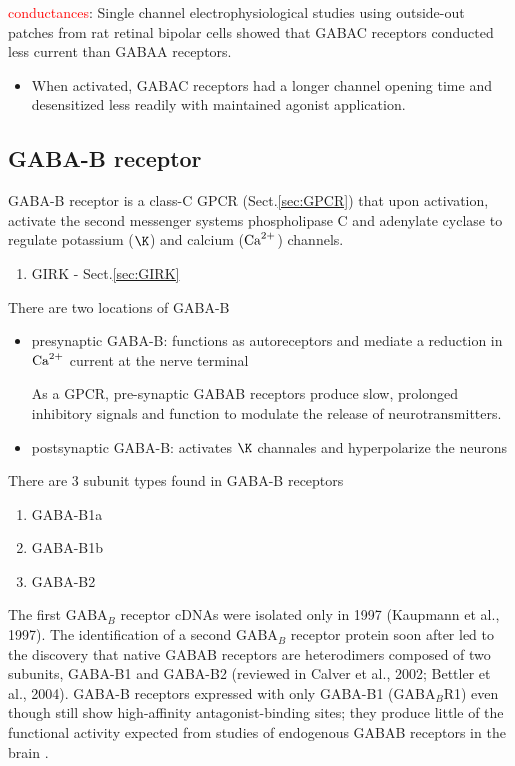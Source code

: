 \textcolor{red}{conductances}: Single channel electrophysiological studies using
outside-out patches from rat retinal bipolar cells showed that GABAC receptors
conducted less current than GABAA receptors. 
\begin{itemize}

  \item  When activated, GABAC receptors had a longer
channel opening time and desensitized less readily with maintained agonist
application.

  
\end{itemize}

\subsection{GABA-B receptor}
\label{sec:GABAB-receptor}


GABA-B receptor is a class-C GPCR (Sect.\ref{sec:GPCR}) that 
upon activation, activate the second messenger systems phospholipase C and
adenylate cyclase to regulate potassium ($\K$) and calcium (${\text{Ca}^{2+}}$) channels.
\begin{enumerate}
  \item GIRK - Sect.\ref{sec:GIRK}
\end{enumerate}

There are two locations of GABA-B
\begin{itemize}
  \item presynaptic GABA-B: functions as autoreceptors and mediate a reduction
  in ${\text{Ca}^{2+}}$ current at the nerve terminal

As a GPCR, pre-synaptic GABAB  receptors produce slow, prolonged inhibitory
signals and function to modulate the release of neurotransmitters. 
  
  \item postsynaptic GABA-B: activates $\K$ channales and hyperpolarize the
  neurons
\end{itemize}


There are 3 subunit types found in GABA-B receptors
\begin{enumerate}
  \item GABA-B1a
  
  \item GABA-B1b
  
  \item GABA-B2
\end{enumerate}

The first GABA$_B$ receptor cDNAs were isolated only in 1997 (Kaupmann et al.,
1997).  The identification of a second GABA$_B$ receptor protein soon after led
to the discovery that native GABAB receptors are heterodimers composed of two
subunits, GABA-B1 and GABA-B2  (reviewed in Calver et al., 2002; Bettler et al.,
2004).   GABA-B receptors expressed with only GABA-B1 (GABA$_B$R1) even though
still show high-affinity antagonist-binding sites; they produce little of the functional
activity expected from studies of endogenous GABAB receptors in the brain
\citep{jones1998}.

